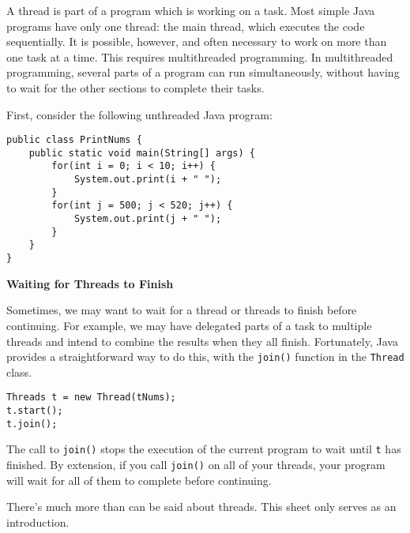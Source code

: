 \documentclass[12pt]{article}
\begin{document}
A thread is part of a program which is working on a task.  Most simple
Java programs have only one thread: the main thread, which executes
the code sequentially.  It is possible, however, and often necessary
to work on more than one task at a time.  This requires multithreaded
programming.  In multithreaded programming, several parts of a program
can run simultaneously, without having to wait for the other sections
to complete their tasks.

 First, consider the following unthreaded Java program: 

\begin{verbatim}
public class PrintNums {
    public static void main(String[] args) {
        for(int i = 0; i < 10; i++) {
            System.out.print(i + " ");
        }
        for(int j = 500; j < 520; j++) {
            System.out.print(j + " ");
        }
    }
}

\end{verbatim}
\textbf{Waiting for Threads to Finish}

 Sometimes, we may want to wait for a thread or threads to finish
 before continuing.  For example, we may have delegated parts of a
 task to multiple threads and intend to combine the results when they
 all finish.  Fortunately, Java provides a straightforward way to do
 this, with the \texttt{join()} function in the \texttt{Thread} class.
 
\begin{verbatim}
Threads t = new Thread(tNums);
t.start();
t.join();
\end{verbatim}

The call to \texttt{join()} stops the execution of the current program
to wait until \texttt{t} has finished.  By extension, if you call
\texttt{join()} on all of your threads, your program will wait for all
of them to complete before continuing.

There's much more than can be said about threads.  This sheet only
serves as an introduction.
\end{document}
